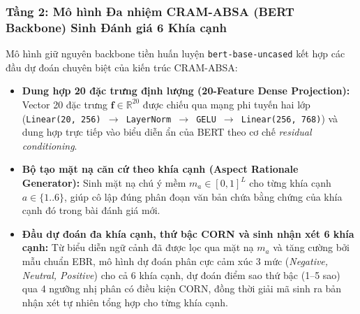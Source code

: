 \documentclass[pdflatex,sn-mathphys-num]{sn-jnl}
\theoremstyle{thmstyleone}
\theoremstyle{thmstyletwo}
\theoremstyle{thmstylethree}
\begin{document}
\subsubsection{Tầng 2: Mô hình Đa nhiệm CRAM-ABSA (BERT Backbone) Sinh Đánh giá 6 Khía cạnh}
Mô hình giữ nguyên backbone tiền huấn luyện \texttt{bert-base-uncased} kết hợp các đầu dự đoán chuyên biệt của kiến trúc CRAM-ABSA:
\begin{itemize}
    \item \textbf{Dung hợp 20 đặc trưng định lượng (20-Feature Dense Projection):} Vector 20 đặc trưng $\mathbf{f} \in \mathbb{R}^{20}$ được chiếu qua mạng phi tuyến hai lớp (\texttt{Linear(20, 256) $\to$ LayerNorm $\to$ GELU $\to$ Linear(256, 768)}) và dung hợp trực tiếp vào biểu diễn ẩn của BERT theo cơ chế \textit{residual conditioning}.
    \item \textbf{Bộ tạo mặt nạ căn cứ theo khía cạnh (Aspect Rationale Generator):} Sinh mặt nạ chú ý mềm $m_a \in [0, 1]^L$ cho từng khía cạnh $a \in \{1..6\}$, giúp cô lập đúng phân đoạn văn bản chứa bằng chứng của khía cạnh đó trong bài đánh giá mới.
    \item \textbf{Đầu dự đoán đa khía cạnh, thứ bậc CORN và sinh nhận xét 6 khía cạnh:} Từ biểu diễn ngữ cảnh đã được lọc qua mặt nạ $m_a$ và tăng cường bởi mẫu chuẩn EBR, mô hình dự đoán phân cực cảm xúc 3 mức (\textit{Negative, Neutral, Positive}) cho cả 6 khía cạnh, dự đoán điểm sao thứ bậc (1--5 sao) qua 4 ngưỡng nhị phân có điều kiện CORN, đồng thời giải mã sinh ra bản nhận xét tự nhiên tổng hợp cho từng khía cạnh.
\end{itemize}
\end{document}
